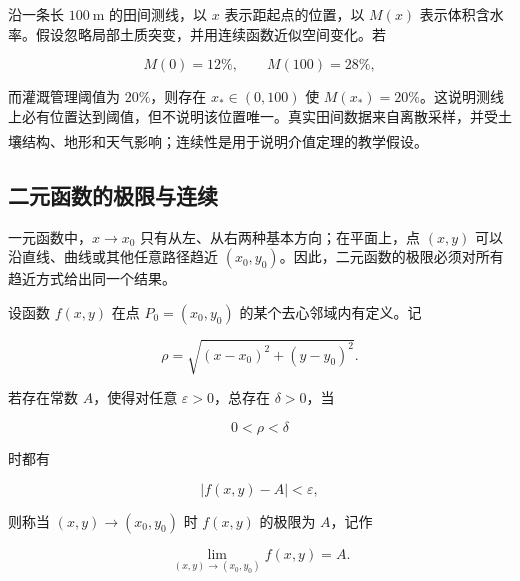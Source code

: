 \documentclass[fontset=fandol]{ctexart}
\newcommand{\upcite}[1]{\textsuperscript{\textsuperscript{\cite{#1}}}}
\begin{document}
\begin{application}[农业：田间含水率阈值]

沿一条长 $100\ \mathrm m$ 的田间测线，以 $x$ 表示距起点的位置，以 $M(x)$ 表示体积含水率。假设忽略局部土质突变，并用连续函数近似空间变化。若

\[

M(0)=12\%,\qquad M(100)=28\%,

\]

而灌溉管理阈值为 $20\%$，则存在 $x_*\in(0,100)$ 使 $M(x_*)=20\%$。这说明测线上必有位置达到阈值，但不说明该位置唯一。真实田间数据来自离散采样，并受土壤结构、地形和天气影响；连续性是用于说明介值定理的教学假设。\upcite{BradyWeil}

\end{application}





\subsection{二元函数的极限与连续}



一元函数中，\(x\to x_0\) 只有从左、从右两种基本方向；在平面上，点 \((x,y)\) 可以沿直线、曲线或其他任意路径趋近 \((x_0,y_0)\)。因此，二元函数的极限必须对所有趋近方式给出同一个结果。



\begin{definition}[二元函数的极限]

	设函数 \(f(x,y)\) 在点 \(P_0=(x_0,y_0)\) 的某个去心邻域内有定义。记

	\[

	\rho=\sqrt{(x-x_0)^2+(y-y_0)^2}.

	\]

	若存在常数 \(A\)，使得对任意 \(\varepsilon>0\)，总存在 \(\delta>0\)，当

	\[

	0<\rho<\delta

	\]

	时都有

	\[

	|f(x,y)-A|<\varepsilon,

	\]

	则称当 \((x,y)\to(x_0,y_0)\) 时 \(f(x,y)\) 的极限为 \(A\)，记作

	\[

	\lim_{(x,y)\to(x_0,y_0)}f(x,y)=A.

	\]

\end{definition}
\end{document}
